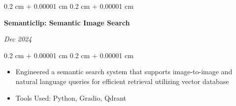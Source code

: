 \documentclass[10pt, letterpaper]{article}
\newenvironment{highlights}{
    \begin{itemize}[
        topsep=0.10 cm,
        parsep=0.10 cm,
        partopsep=0pt,
        itemsep=0pt,
        leftmargin=0.4 cm + 10pt
    ]
}{
    \end{itemize}
} %
\newenvironment{onecolentry}{
    \begin{adjustwidth}{
        0.2 cm + 0.00001 cm
    }{
        0.2 cm + 0.00001 cm
    }
}{
    \end{adjustwidth}
} %
\newenvironment{twocolentry}[2][]{
    \onecolentry
    \def\secondColumn{#2}
    \setcolumnwidth{\fill, 4.5 cm}
    \begin{paracol}{2}
}{
    \switchcolumn \raggedleft \secondColumn
    \end{paracol}
    \endonecolentry
} %
\begin{document}
        \vspace{0.2 cm}

        \begin{twocolentry}{
            
            
        \textit{Dec 2024}}
            \textbf{Semanticlip: Semantic Image Search}
        \end{twocolentry}

        \vspace{0.10 cm}
        \begin{onecolentry}
            \begin{highlights}
                \item Engineered a semantic search system that supports image-to-image and natural language queries for efficient retrieval utilizing vector database
                \item Tools Used: Python, Gradio, Qdrant
            \end{highlights}
        \end{onecolentry}



    
\end{document}
